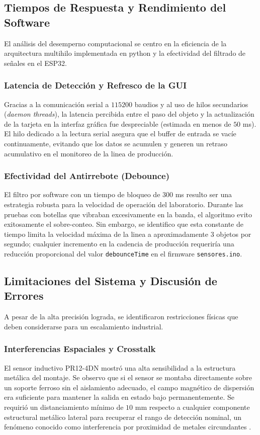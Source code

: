 \documentclass[conference]{IEEEtran}
\begin{document}
\subsection{Tiempos de Respuesta y Rendimiento del Software}

El análisis del desemperno computacional se centro en la eficiencia de la arquitectura multihilo implementada en python y la efectividad del filtrado de señales en el ESP32.

\subsubsection{Latencia de Detección y Refresco de la GUI}
Gracias a la comunicación serial a $115200$ baudios y al uso de hilos secundarios (\textit{daemon threads}), la latencia percibida entre el paso del objeto y la actualización de la tarjeta en la interfaz gráfica fue despreciable (estimada en menos de $50$ ms). El hilo dedicado a la lectura serial asegura que el buffer de entrada se vacíe continuamente, evitando que los datos se acumulen y generen un retraso acumulativo en el monitoreo de la linea de producción.

\subsubsection{Efectividad del Antirrebote (Debounce)}
El filtro por software con un tiempo de bloqueo de $300$ ms resulto ser una estrategia robusta para la velocidad de operación del laboratorio. Durante las pruebas con botellas que vibraban excesivamente en la banda, el algoritmo evito exitosamente el sobre-conteo. Sin embargo, se identifico que esta constante de tiempo limita la velocidad máxima de la linea a aproximadamente $3$ objetos por segundo; cualquier incremento en la cadencia de producción requeriría una reducción proporcional del valor \texttt{debounceTime} en el firmware \texttt{sensores.ino}.

\subsection{Limitaciones del Sistema y Discusión de Errores}

A pesar de la alta precisión lograda, se identificaron restricciones físicas que deben considerarse para un escalamiento industrial.

\subsubsection{Interferencias Espaciales y Crosstalk}
El sensor inductivo PR12-4DN mostró una alta sensibilidad a la estructura metálica del montaje. Se observo que si el sensor se montaba directamente sobre un soporte ferroso sin el aislamiento adecuado, el campo magnético de dispersión era suficiente para mantener la salida en estado bajo permanentemente. Se requirió un distanciamiento mínimo de $10$ mm respecto a cualquier componente estructural metálico lateral para recuperar el rango de detección nominal, un fenómeno conocido como interferencia por proximidad de metales circundantes \cite{sensores_5}.
\end{document}
